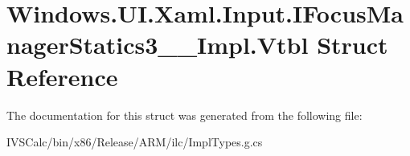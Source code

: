 \hypertarget{struct_windows_1_1_u_i_1_1_xaml_1_1_input_1_1_i_focus_manager_statics3_____impl_1_1_vtbl}{}\section{Windows.\+U\+I.\+Xaml.\+Input.\+I\+Focus\+Manager\+Statics3\+\_\+\+\_\+\+Impl.\+Vtbl Struct Reference}
\label{struct_windows_1_1_u_i_1_1_xaml_1_1_input_1_1_i_focus_manager_statics3_____impl_1_1_vtbl}


The documentation for this struct was generated from the following file\+:\begin{DoxyCompactItemize}
\item 
I\+V\+S\+Calc/bin/x86/\+Release/\+A\+R\+M/ilc/Impl\+Types.\+g.\+cs\end{DoxyCompactItemize}
